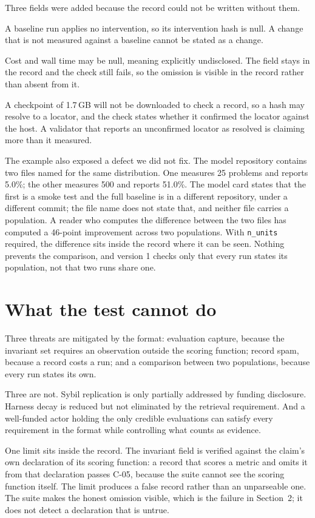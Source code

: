 \documentclass[11pt]{article}
\begin{document}
Three fields were added because the record could not be written without them.

A baseline run applies no intervention, so its intervention hash is null. A
change that is not measured against a baseline cannot be stated as a change.

Cost and wall time may be null, meaning explicitly undisclosed. The field stays
in the record and the check still fails, so the omission is visible in the
record rather than absent from it.

A checkpoint of 1.7\,GB will not be downloaded to check a record, so a hash may
resolve to a locator, and the check states whether it confirmed the locator
against the host. A validator that reports an unconfirmed locator as resolved
is claiming more than it measured.

The example also exposed a defect we did not fix. The model repository contains
two files named for the same distribution. One measures 25 problems and reports
5.0\%; the other measures 500 and reports 51.0\%. The model card states that the
first is a smoke test and the full baseline is in a different repository, under
a different commit; the file name does not state that, and neither file carries
a population. A reader who computes the difference between the two files has
computed a 46-point improvement across two populations. With
\texttt{n\_units} required, the difference sits inside the record where it can
be seen. Nothing prevents the comparison, and version 1 checks only that every
run states its population, not that two runs share one.

\section{What the test cannot do}
\label{sec:cannot}

Three threats are mitigated by the format: evaluation capture, because the
invariant set requires an observation outside the scoring function; record
spam, because a record costs a run; and a comparison between two populations,
because every run states its own.

Three are not. Sybil replication is only partially addressed by funding
disclosure. Harness decay is reduced but not eliminated by the retrieval
requirement. And a well-funded actor holding the only credible evaluations can
satisfy every requirement in the format while controlling what counts as
evidence.

One limit sits inside the record. The invariant field is verified against the
claim's own declaration of its scoring function: a record that scores a metric
and omits it from that declaration passes C-05, because the suite cannot see the
scoring function itself. The limit produces a false record rather than an
unparseable one. The suite makes the honest omission visible, which is the
failure in Section~2; it does not detect a declaration that is untrue.
\end{document}
